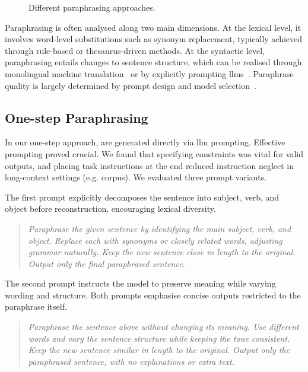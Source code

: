 \begin{figure}[h]
    \centering
    
    \caption[Different paraphrasing approaches]{Different paraphrasing approaches.}
    \label{fig:paraphrasing_approaches}
\end{figure}


Paraphrasing is often analysed along two main dimensions. 
At the lexical level, it involves word-level substitutions such as synonym replacement, typically achieved through rule-based or thesaurus-driven methods. 
At the syntactic level, paraphrasing entails changes to sentence structure, which can be realised through monolingual machine translation~\citep{zhou_paraphrase_2021} or by explicitly prompting \acp{llm}~\citep{kurt_pehlivanoglu_comparative_2024}.
Paraphrase quality is largely determined by prompt design and model selection~\citep{Wu_ODD_challenges_2025}.


\subsection{One-step Paraphrasing}

In our one-step approach, \imps{} are generated directly via \ac{llm} prompting. 
Effective prompting proved crucial. 
We found that specifying constraints was vital for valid outputs, and placing task instructions at the end reduced instruction neglect in long-context settings (e.g. \dataGutenberg{} corpus). 
We evaluated three prompt variants.

The first prompt explicitly decomposes the sentence into subject, verb, and object before reconstruction, encouraging lexical diversity. 
\begin{quote}
    \textit{Paraphrase the given sentence by identifying the main subject, verb, and object. Replace each with synonyms or closely related words, adjusting grammar naturally. Keep the new sentence close in length to the original. Output only the final paraphrased sentence.}
\end{quote}

The second prompt instructs the model to preserve meaning while varying wording and structure. 
Both prompts emphasise concise outputs restricted to the paraphrase itself.
\begin{quote}
    \textit{Paraphrase the sentence above without changing its meaning. Use different words and vary the sentence structure while keeping the tone consistent. Keep the new sentence similar in length to the original. Output only the paraphrased sentence, with no explanations or extra text.}
\end{quote}

